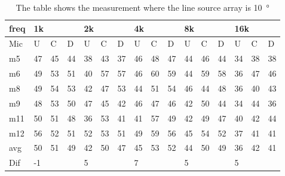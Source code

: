 \begin{table}[H]
\centering
\caption{The table shows the measurement where the line source array is \SI{10}{\degree}}
\begin{tabular}{l|l|l|l|l|l|l|l|l|l|l|l|l|lll}
freq & \multicolumn{3}{l|}{1k} & \multicolumn{3}{l|}{2k} & \multicolumn{3}{l|}{4k} & \multicolumn{3}{l|}{8k} & \multicolumn{3}{l}{16k}                                \\ \hline
Mic  & U      & C      & D     & U      & C      & D     & U      & C      & D     & U      & C      & D     & \multicolumn{1}{l|}{U}  & \multicolumn{1}{l|}{C}  & D  \\ \hline
m5    & 47     & 45     & 44     &  38    & 43     &  37    &  46    & 48      &  47    &    44   &  46    &  44    & \multicolumn{1}{l|}{34} & \multicolumn{1}{l|}{38} & 38 \\ 
m6    & 49     &  53    &  51    &  40    &  57    &  57    & 46     &  60     &   59   &    44   &    59  &   58   & \multicolumn{1}{l|}{36} & \multicolumn{1}{l|}{47} &46  \\ 
m8    & 49     &  54    & 53     & 42     &  47    & 53     & 44     & 51      &    54  &    46   &   44   &   48   & \multicolumn{1}{l|}{36} & \multicolumn{1}{l|}{40} & 43 \\ 
m9    &  48    & 53     &  50    & 47     &   45   &  42    & 46     &  47     &   46   &     42  &    50  &   44   & \multicolumn{1}{l|}{34} & \multicolumn{1}{l|}{44} & 36 \\ 
m11  &  50    & 51     &  48    &  36    &   53   &  41    & 41     &   57    &    49  &     42  &    49  &    47  & \multicolumn{1}{l|}{40} & \multicolumn{1}{l|}{42} & 44 \\ 
m12  &  56    & 52     &  51    &  52    &  53    & 51     & 49     &   59    &    56  &    45   &    54  &  52    & \multicolumn{1}{l|}{37} & \multicolumn{1}{l|}{41} & 41 \\ \hline
avg &  50    & 51     &  49    &   42   &  50    & 47     &  45    &  53     & 52     &   44    &  50    &  49    & \multicolumn{1}{l|}{36} & \multicolumn{1}{l|}{42}  & 41  \\ \hline  
Dif & \multicolumn{3}{l|}{-1} & \multicolumn{3}{l|}{5} & \multicolumn{3}{l|}{7} & \multicolumn{3}{l|}{5} & \multicolumn{3}{l}{5}                                
\end{tabular}
\end{table}


